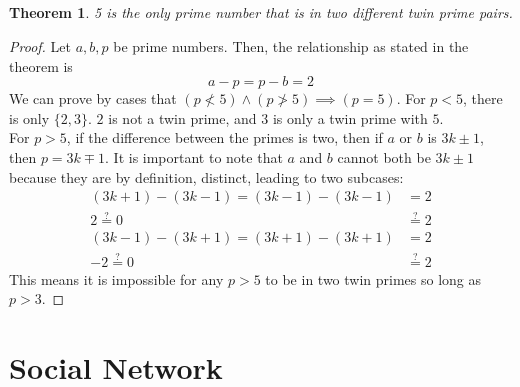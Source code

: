 \documentclass{article}
\newtheorem{theorem}{Theorem}
\begin{document}
\subsection{}

\begin{theorem}
    5 is the only prime number that is in two different twin prime pairs.
\end{theorem}
\begin{proof}
    Let \(a, b, p\) be prime numbers.
    Then, the relationship as stated in the theorem is
    \begin{equation}
        a - p = p - b = 2
    \end{equation}
    We can prove by cases that \((p \nless 5) \land (p \ngtr 5) \implies (p = 5)\).
    For \(p < 5\), there is only \(\{2, 3\}\).
    \(2\) is not a twin prime, and \(3\) is only a twin prime with \(5\). \\
    For \(p > 5\), if the difference between the primes is two, then if \(a\) or \(b\) is \(3k \pm 1\), then \(p = 3k \mp 1\).
    It is important to note that \(a\) and \(b\) cannot both be \(3k \pm 1\) because they are by definition, distinct, leading to two subcases:
    \begin{align}
        (3k + 1) - (3k - 1) = (3k - 1) - (3k - 1) &= 2 \\
        2 \overset{?}{=} 0 &\overset{?}{=} 2 \\
        (3k - 1) - (3k + 1) = (3k + 1) - (3k + 1) &= 2 \\
        -2 \overset{?}{=} 0 &\overset{?}{=} 2
    \end{align}
    This means it is impossible for any \(p > 5\) to be in two twin primes so long as \(p > 3\).
\end{proof}

\section{Social Network}

\subsection{}
\end{document}
